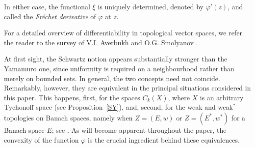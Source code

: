 \documentclass[12pt]{amsart}
\theoremstyle{plain}
\theoremstyle{definition}
\theoremstyle{remark}
\def\vv{\varphi}
\begin{document}
In either case, the functional $\xi$ is uniquely determined, denoted by $\vv'(z)$, and called the \emph{Fr\'echet derivative} of $\vv$ at $z$.

For a detailed overview  of differentiability in topological vector spaces, we refer the reader to the survey of V.I. Averbukh and O.G. Smolyanov \cite{as}.

At first sight, the Schwartz notion appears substantially stronger than the Yamamuro one, since uniformity is required on a neighbourhood rather than merely on bounded sets. In general, the two concepts need not coincide. Remarkably, however, they are equivalent in the principal situations considered in this paper. This happens, first, for the spaces $C_k(X)$, where $X$ is an arbitrary Tychonoff space (see Proposition~\ref{SY}), and, second, for the weak and weak$^{*}$ topologies on Banach spaces, namely when $Z=(E,w)$ or $Z=(E^{*},w^{*})$ for a Banach space $E$; see \cite{s}. As will become apparent throughout the paper, the convexity of the function $\vv$ is the crucial ingredient behind these equivalences.
\end{document}
